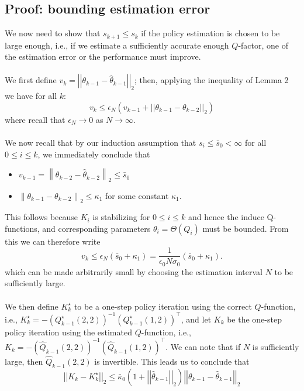 \documentclass{article}[12pt]
\newcommand{\twonorm}[1]{\left|\left|#1\right|\right|_2}
\begin{document}
\subsection{Proof: bounding estimation error}
We now need to show that $s_{k+1} \leq s_k$ if the policy estimation is chosen to be large enough, i.e., if we estimate a sufficiently accurate enough $Q$-factor, one of the estimation error or the performance must improve. \\ \\
We first define $v_k = \twonorm{\theta_{k-1}-\hat{\theta}_{k-1}}$; then, applying the inequality of Lemma 2 we have for all $k$:
\begin{equation}\label{eq:22}
v_k \leq \epsilon_N(v_{k-1} + \twonorm{\theta_{k-1}-\theta_{k-2}})
\end{equation}
where recall that $\epsilon_N\to 0$ as $N\to\infty$.\\ \\
We now recall that by our induction assumption that $s_{i} \leq \bar{s}_{0}<\infty$ for all $0 \leq i \leq k$, we immediately conclude that
\begin{itemize} 
    \item $v_{k-1}=\left\|\theta_{k-2}-\hat{\theta}_{k-2}\right\|_{2} \leq \bar{s}_{0}$
    \item $\left\|\theta_{k-1}-\theta_{k-2}\right\|_{2} \leq \kappa_{1}$ for some constant $\kappa_{1}$.
\end{itemize}
This follows because $K_i$ is stabilizing for $0 \leq i \leq k$ and hence the induce Q-functions, and corresponding parameters $\theta_{i}=\Theta\left(Q_{i}\right)$ must be bounded. From this we can therefore write 
\begin{equation}\label{eq:23}
v_k \leq \epsilon_N(\bar{s}_0+\kappa_1)=\frac{1}{\epsilon_0 N \sigma_0}(\bar{s}_0+\kappa_1).
\end{equation}
which can be made arbitrarily small by choosing the estimation interval $N$ to be sufficiently large. \\ \\ 
We then define $K^\star_k$ to be a one-step policy iteration using the correct $Q$-function, i.e., $K^\star_k = - (Q^\star_{k-1}(2,2))^{-1}(Q^\star_{k-1}(1,2))^\top$, and let $K_k$ be the one-step policy iteration using the estimated $Q$-function, i.e., $K_k = - (\hat Q_{k-1}(2,2))^{-1}(\hat Q_{k-1}(1,2))^\top$. We can note that if $N$ is sufficiently large, then $\hat Q_{k-1}(2,2)$ is invertible.
\newpage
This leads us to conclude that 
\begin{equation}\label{eq:24}
\twonorm{K_k-K^\star_k}\leq \bar{\kappa}_0(1+\twonorm{\hat{\theta}_{k-1}})\twonorm{\theta_{k-1}-\hat{\theta}_{k-1}}
\end{equation}
\end{document}
